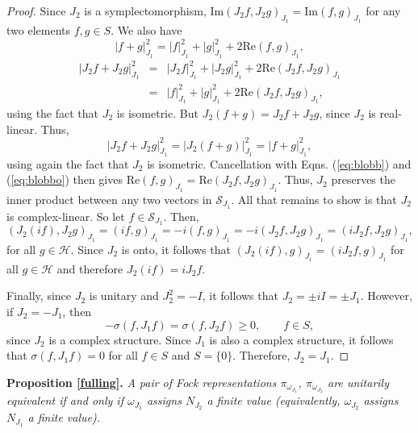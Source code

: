 \documentclass[12pt]{article}
\theoremstyle{remark}
\theoremstyle{definition}
\newcommand{\hil}[1]{\mathcal{#1}}
\begin{document}
\begin{proof}
Since $J_{2}$ is a symplectomorphism, 
$\mathrm{Im}(J_{2}f,J_{2}g)_{J_{1}}=\mathrm{Im}(f,g)_{J_{1}}$ 
for any two elements $f,g\in S$.  We 
also have
\begin{equation} \label{eq:blobb}
|f+g|_{J_{1}}^{2} = |f|_{J_{1}}^{2}+|g|_{J_{1}}^{2}+2\mathrm{Re}(f,g)_{J_{1}},
\end{equation}
\begin{eqnarray} 
|J_{2}f+J_{2}g|_{J_{1}}^{2} & = & 
|J_{2}f|_{J_{1}}^{2}+|J_{2}g|_{J_{1}}^{2}+2\mathrm{Re}(J_{2}f,J_{2}g)_{J_{1}} \\ 
\label{eq:blobbo}
& = & 
|f|_{J_{1}}^{2}+|g|_{J_{1}}^{2}+2
\mathrm{Re}(J_{2}f,J_{2}g)_{J_{1}},
\end{eqnarray}
using the fact that $J_{2}$ is isometric.  But $J_{2}(f+g)=J_{2}f+J_{2}g$, since $J_{2}$ is
real-linear.  Thus,
\begin{equation}
 |J_{2}f+J_{2}g|_{J_{1}}^{2} = |J_{2}(f+g)|_{J_{1}}^{2} = |f+g|_{J_{1}}^{2},
 \end{equation}
using again the fact that $J_{2}$ is isometric.  Cancellation with 
Eqns.  (\ref{eq:blobb}) and (\ref{eq:blobbo})
then gives $\mathrm{Re}(f,g)_{J_{1}}=\mathrm{Re}(J_{2}f,J_{2}g)_{J_{1}}$.
Thus, $J_{2}$ preserves the inner product between any two vectors in 
$\hil{S}_{J_{1}}$. All 
 that remains to show is that $J_{2}$ is complex-linear. 
 So let $f\in \hil{S}_{J_{1}}$.  Then, \begin{equation}
(J_{2}(if),J_{2}g)_{J_{1}} = (if,g)_{J_{1}}=-i(f,g)_{J_{1}}=-i(J_{2}f,J_{2}g)_{J_{1}}=(iJ_{2}f,J_{2}g)_{J_{1}} ,\end{equation}
for all $g\in \hil{H}$.  Since $J_{2}$ is onto, it follows that
$(J_{2}(if),g)_{J_{1}}=(iJ_{2}f,g)_{J_{1}}$ for all $g\in \hil{H}$ and therefore $J_{2}(if)=iJ_{2}f$.  

Finally, since $J_{2}$ is unitary and
$J_{2}^{2}=-I$, it follows that $J_{2}=\pm iI=\pm J_{1}$.  However, if $J_{2}=-J_{1}$,
then \begin{equation}
-\sigma (f,J_{1}f)=\sigma (f,J_{2}f)\geq 0 , \qquad f\in S ,\end{equation}
since $J_{2}$ is a complex structure.  Since $J_{1}$ is also a complex
structure, it follows that $\sigma (f,J_{1}f)=0$ for all $f\in S$ and 
$S=\{ 0\}$.  Therefore, $J_{2}=J_{1}$.  \end{proof}

\noindent\textbf{Proposition \ref{fulling}.} \emph{A pair of Fock representations
$\pi_{\omega_{J_{1}}}$, $\pi_{\omega_{J_{2}}}$ are unitarily 
equivalent if and only if
$\omega_{J_{1}}$ assigns $N_{J_{2}}$ a finite value (equivalently, 
$\omega_{J_{2}}$ assigns $N_{J_{1}}$ a finite value).} 
 
\end{document}
